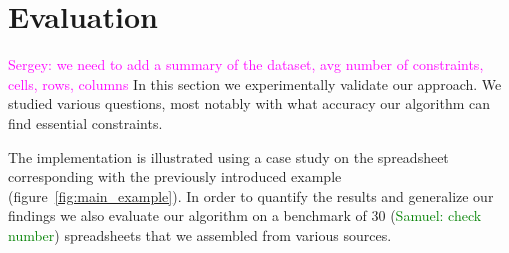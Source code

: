 \documentclass{IEEEtran}
\newcommand{\sergey}[1]{\textcolor{magenta}{{\sc Sergey:} #1}\xspace}
\newcommand{\samuel}[1]{\textcolor{green}{{\sc Samuel:} #1}\xspace}
\newcommand{\constraints}{\ensuremath{\mathcal{T}}\xspace}
\newcommand{\format}[1]{\textit{#1}\xspace}
\newcommand{\extractgroups}{\format{extractGroups}}
\newcommand{\extracttables}{\format{extractTables}}
\newcommand{\learnconstraints}{\format{LearnConstraints}}
\newcommand{\dependencies}{\ensuremath{\mathcal{D}}\xspace}
\theoremstyle{definition}
\begin{document}



\newcommand{\runtotal}{16.12}
\newcommand{\runtotalstd}{0.62}

\newcommand{\runfile}{0.50}
\newcommand{\runfilestd}{0.02}

\section{Evaluation}\label{sec:evaluation}
\sergey{we need to add a summary of the dataset, avg number of constraints, cells, rows, columns}
In this section we experimentally validate our approach.
We studied various questions, most notably with what accuracy our algorithm can find essential constraints.

The implementation is illustrated using a case study on the spreadsheet corresponding with the previously introduced example (figure~\ref{fig:main_example}).
In order to quantify the results and generalize our findings we also evaluate our algorithm on a benchmark of 30 (\samuel{check number}) spreadsheets that we assembled from various sources.
\end{document}
